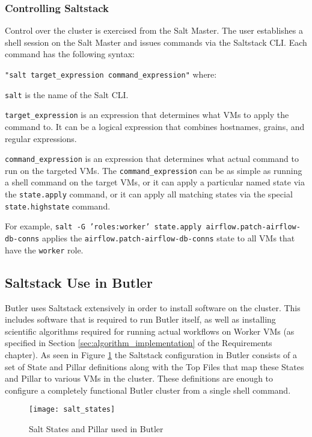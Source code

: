\subsubsection{Controlling Saltstack}

Control over the cluster is exercised from the Salt Master. The user establishes a shell session on the Salt Master and issues commands via the Saltstack CLI. Each command has the following syntax:

\texttt{"salt target_expression command_expression"} where:

\texttt{salt} is the name of the Salt CLI.

\texttt{target_expression} is an expression that determines what VMs to apply the command to. It can be a logical expression that combines hostnames, grains, and regular expressions.

\texttt{command_expression} is an expression that determines what actual command to run on the targeted VMs. The \texttt{command_expression} can be as simple as running a shell command on the target VMs, or it can apply a particular named state via the \texttt{state.apply} command, or it can apply all matching states via the special \texttt{state.highstate} command.

For example, \texttt{salt -G 'roles:worker' state.apply airflow.patch-airflow-db-conns} applies the \texttt{airflow.patch-airflow-db-conns} state to all VMs that have the \texttt{worker} role.

\subsection{Saltstack Use in Butler}

Butler uses Saltstack extensively in order to install software on the cluster. This includes software that is required to run Butler itself, as well as installing scientific algorithms required for running actual workflows on Worker VMs (as specified in Section \ref{sec:algorithm_implementation} of the Requirements chapter). As seen in Figure \ref{fig:salt_states} the Saltstack configuration in Butler consists of a set of State and Pillar definitions along with the Top Files that map these States and Pillar to various VMs in the cluster. These definitions are enough to configure a completely functional Butler cluster from a single shell command.

\begin{figure}[H]
\texttt{[image: salt\_states]}
\centering
\caption {Salt States and Pillar used in Butler}
\label{fig:salt_states}
\end{figure} 


